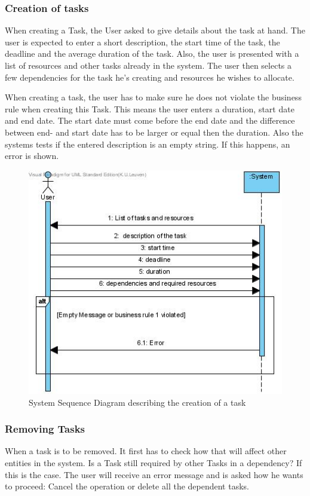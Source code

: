 			\subsubsection{Creation of tasks}
				When creating a Task, the User asked to give details about the task at hand. The user is expected to enter a short description, the start time of the task, the deadline and the average duration of the task.
				Also, the user is presented with a list of resources and other tasks already in the system. The user then selects a few dependencies for the task he's creating and resources he wishes to allocate.

				When creating a task, the user has to make sure he does not violate the business rule when creating this Task. This means the user enters a duration, start date and end date. The start date must come before the end date and the difference between end- and start date has to be larger or equal then the duration. Also the systems tests if the entered description is an empty string. If this happens, an error is shown.\\
				\begin{figure}[H]
					\begin{center}
						\includegraphics[scale=0.5]{images/ssd_create_task.jpg}
					\end{center}
					\caption{System Sequence Diagram describing the creation of a task}
				\end{figure}
			\subsubsection{Removing Tasks}
			When a task is to be removed. It first has to check how that will affect other entities in the system. Is a Task still required by other Tasks in a dependency?
			If this is the case. The user will receive an error message and is asked how he wants to proceed: Cancel the operation or delete all the dependent tasks.
			
